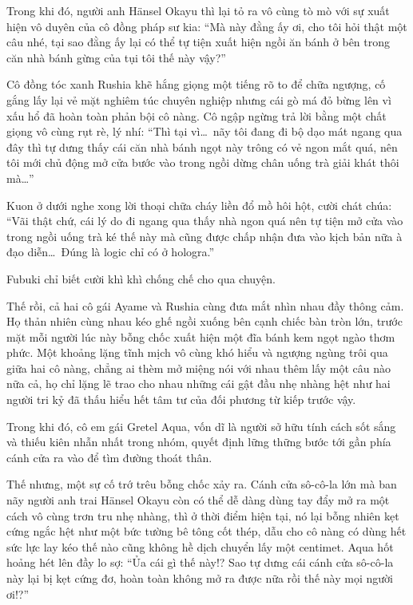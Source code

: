 \documentclass[../main.tex]{subfiles}
\begin{document}
Trong khi đó, người anh Hänsel Okayu thì lại tỏ ra vô cùng tò mò với sự xuất hiện vô duyên của cô đồng pháp sư kia: ``Mà này đằng ấy ơi, cho tôi hỏi thật một câu nhé, tại sao đằng ấy lại có thể tự tiện xuất hiện ngồi ăn bánh ở bên trong căn nhà bánh gừng của tụi tôi thế này vậy?''

Cô đồng tóc xanh Rushia khẽ hắng giọng một tiếng rõ to để chữa ngượng, cố gắng lấy lại vẻ mặt nghiêm túc chuyên nghiệp nhưng cái gò má đỏ bừng lên vì xấu hổ đã hoàn toàn phản bội cô nàng. Cô ngập ngừng trả lời bằng một chất giọng vô cùng rụt rè, lý nhí: ``Thì tại vì\dots\ nãy tôi đang đi bộ dạo mát ngang qua đây thì tự dưng thấy cái căn nhà bánh ngọt này trông có vẻ ngon mắt quá, nên tôi mới chủ động mở cửa bước vào trong ngồi dừng chân uống trà giải khát thôi mà\dots''

\il

Kuon ở dưới nghe xong lời thoại chữa cháy liền đổ mồ hôi hột, cười chát chúa: ``Vãi thật chứ, cái lý do đi ngang qua thấy nhà ngon quá nên tự tiện mở cửa vào trong ngồi uống trà ké thế này mà cũng được chấp nhận đưa vào kịch bản nữa à đạo diễn\dots\ Đúng là logic chỉ có ở hologra.''

Fubuki chỉ biết cười khì khì chống chế cho qua chuyện.

\il

Thế rồi, cả hai cô gái Ayame và Rushia cùng đưa mắt nhìn nhau đầy thông cảm. Họ thản nhiên cùng nhau kéo ghế ngồi xuống bên cạnh chiếc bàn tròn lớn, trước mặt mỗi người lúc này bỗng chốc xuất hiện một đĩa bánh kem ngọt ngào thơm phức. Một khoảng lặng tĩnh mịch vô cùng khó hiểu và ngượng ngùng trôi qua giữa hai cô nàng, chẳng ai thèm mở miệng nói với nhau thêm lấy một câu nào nữa cả, họ chỉ lặng lẽ trao cho nhau những cái gật đầu nhẹ nhàng hệt như hai người tri kỷ đã thấu hiểu hết tâm tư của đối phương từ kiếp trước vậy.


Trong khi đó, cô em gái Gretel Aqua, vốn dĩ là người sở hữu tính cách sốt sắng và thiếu kiên nhẫn nhất trong nhóm, quyết định lững thững bước tới gần phía cánh cửa ra vào để tìm đường thoát thân.

Thế nhưng, một sự cố trớ trêu bỗng chốc xảy ra. Cánh cửa sô-cô-la lớn mà ban nãy người anh trai Hänsel Okayu còn có thể dễ dàng dùng tay đẩy mở ra một cách vô cùng trơn tru nhẹ nhàng, thì ở thời điểm hiện tại, nó lại bỗng nhiên kẹt cứng ngắc hệt như một bức tường bê tông cốt thép, dẫu cho cô nàng có dùng hết sức lực lay kéo thế nào cũng không hề dịch chuyển lấy một centimet. Aqua hốt hoảng hét lên đầy lo sợ: ``Ủa cái gì thế này!? Sao tự dưng cái cánh cửa sô-cô-la này lại bị kẹt cứng đơ, hoàn toàn không mở ra được nữa rồi thế này mọi người ơi!?''
\end{document}
